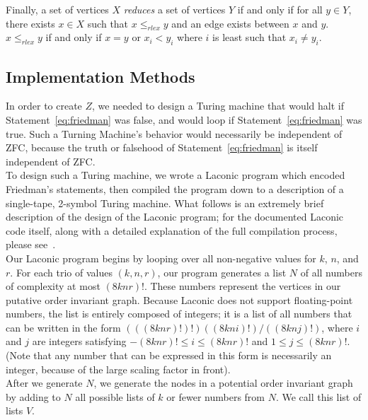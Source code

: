 \documentclass[11pt]{article}
\begin{document}
Finally, a set of vertices $X$ \emph{reduces} a set of vertices $Y$ if and only if for all $y \in Y$, there exists $x \in X$ such that $x \le_{rlex} y$ and an edge exists between $x$ and $y$. $x \le_{rlex} y$ if and only if $x = y$ or $x_i < y_i$ where $i$ is least such that $x_i \not= y_i$.~\cite{personalcomm} \\

\subsection{Implementation Methods}

In order to create $Z$, we needed to design a Turing machine that would halt if Statement~\ref{eq:friedman} was false, and would loop if Statement~\ref{eq:friedman} was true. Such a Turning Machine's behavior would necessarily be independent of ZFC, because the truth or falsehood of  Statement~\ref{eq:friedman} is itself independent of ZFC.~\cite{friedman} \\

To design such a Turing machine, we wrote a Laconic program which encoded Friedman's statements, then compiled the program down to a description of a single-tape, 2-symbol Turing machine. What follows is an extremely brief description of the design of the Laconic program; for the documented Laconic code itself, along with a detailed explanation of the full compilation process, please see~\cite{github}. \\

Our Laconic program begins by looping over all non-negative values for $k$, $n$, and $r$. For each trio of values $(k, n, r)$, our program generates a list $N$ of all numbers of complexity at most $(8knr)!$. These numbers represent the vertices in our putative order invariant graph. Because Laconic does not support floating-point numbers, the list is entirely composed of integers; it is a list of all numbers that can be written in the form $(((8knr)!)!)((8kni)!)/((8knj)!)$, where $i$ and $j$ are integers satisfying $-(8knr)! \le i \le (8knr)!$ and $1 \le j \le (8knr)!$. (Note that any number that can be expressed in this form is necessarily an integer, because of the large scaling factor in front). \\

After we generate $N$, we generate the nodes in a potential order invariant graph by adding to $N$ all possible lists of $k$ or fewer numbers from $N$. We call this list of lists $V$. \\
\end{document}
